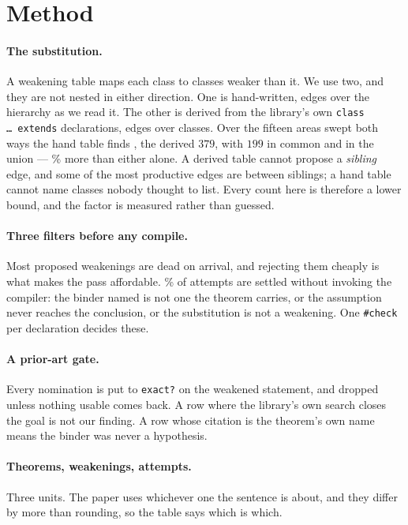 \documentclass[11pt]{article}
\begin{document}
\section{Method}\label{sec:method}

\paragraph{The substitution.} A weakening table maps each class to classes
weaker than it. We use two, and they are not nested in either direction. One is
hand-written, \tableEdges{} edges over the hierarchy as we read it. The other is
derived from the library's own \texttt{class \dots\ extends} declarations,
\derivedEdges{} edges over \derivedClasses{} classes. Over the fifteen areas
swept both ways the hand table finds \rerunHand{}, the derived \(379\), with
\(199\) in common and \rerunUnion{} in the union --- \rerunGainPercent{}\% more
than either alone. A derived table cannot propose a \emph{sibling} edge, and
some of the most productive edges are between siblings; a hand table cannot name
classes nobody thought to list. Every count here is therefore a lower bound, and
the factor is measured rather than guessed.

\paragraph{Three filters before any compile.} Most proposed weakenings are dead
on arrival, and rejecting them cheaply is what makes the pass affordable.
\freeVerdictPercent{}\% of attempts are settled without invoking the compiler:
the binder named is not one the theorem carries, or the assumption never reaches
the conclusion, or the substitution is not a weakening. One \texttt{\#check} per
declaration decides these.

\paragraph{A prior-art gate.} Every nomination is put to \texttt{exact?} on the
weakened statement, and dropped unless nothing usable comes back. A row where
the library's own search closes the goal is not our finding. A row whose
citation is the theorem's own name means the binder was never a hypothesis.

\paragraph{Theorems, weakenings, attempts.} Three units. The paper uses
whichever one the sentence is about, and they differ by more than rounding, so
the table says which is which.
\end{document}
